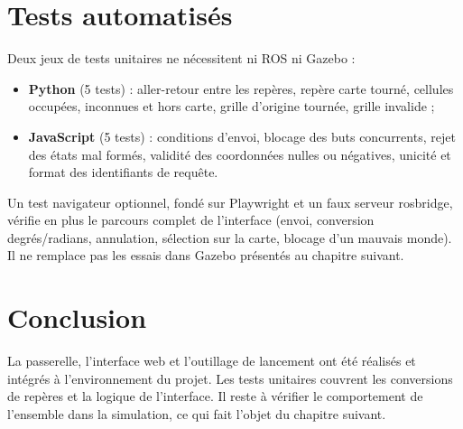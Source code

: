 \section{Tests automatisés}
Deux jeux de tests unitaires ne nécessitent ni ROS ni Gazebo :
\begin{itemize}
  \item \textbf{Python} (5 tests) : aller-retour entre les repères, repère carte tourné,
    cellules occupées, inconnues et hors carte, grille d'origine tournée, grille invalide ;
  \item \textbf{JavaScript} (5 tests) : conditions d'envoi, blocage des buts concurrents,
    rejet des états mal formés, validité des coordonnées nulles ou négatives,
    unicité et format des identifiants de requête.
\end{itemize}
Un test navigateur optionnel, fondé sur Playwright et un faux serveur rosbridge, vérifie
en plus le parcours complet de l'interface (envoi, conversion degrés/radians, annulation,
sélection sur la carte, blocage d'un mauvais monde). Il ne remplace pas les essais dans
Gazebo présentés au chapitre suivant.

\section*{Conclusion}
La passerelle, l'interface web et l'outillage de lancement ont été réalisés et intégrés
à l'environnement du projet. Les tests unitaires couvrent les conversions de repères et la logique de
l'interface. Il reste à vérifier le comportement de l'ensemble dans la simulation, ce qui
fait l'objet du chapitre suivant.
